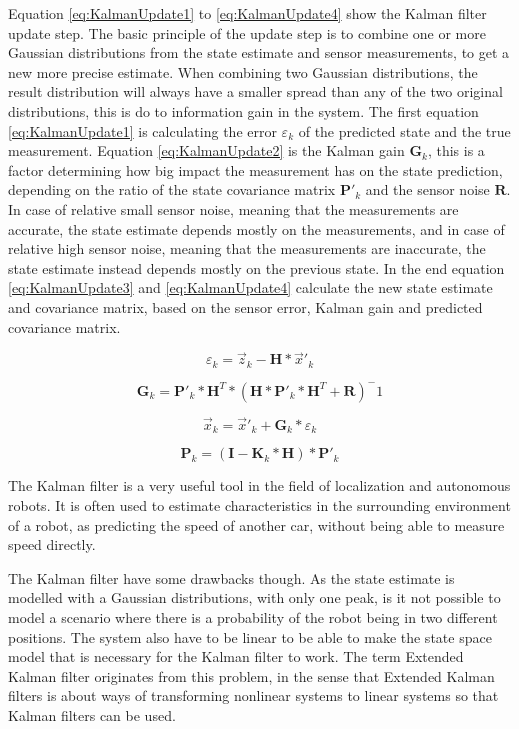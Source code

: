 Equation \ref{eq:KalmanUpdate1} to \ref{eq:KalmanUpdate4} show the Kalman filter update step.
The basic principle of the update step is to combine one or more Gaussian distributions from the state estimate and sensor measurements, to get a new more precise estimate.
When combining two Gaussian distributions, the result distribution will always have a smaller spread than any of the two original distributions, this is do to information gain in the system.
The first equation \ref{eq:KalmanUpdate1} is calculating the error $ \varepsilon_{k} $ of the predicted state and the true measurement.
Equation \ref{eq:KalmanUpdate2} is the Kalman gain $ \boldsymbol{G}_{k} $, this is a factor determining how big impact the measurement has on the state prediction, depending on the ratio of the state covariance matrix $\boldsymbol{P}'_{k}$ and the sensor noise $\boldsymbol{R}$.
In case of relative small sensor noise, meaning that the measurements are accurate, the state estimate depends mostly on the measurements, and in case of relative high sensor noise, meaning that the measurements are inaccurate, the state estimate instead depends mostly on the previous state.
In the end equation \ref{eq:KalmanUpdate3} and \ref{eq:KalmanUpdate4} calculate the new state estimate and covariance matrix, based on the sensor error, Kalman gain and predicted covariance matrix.

\begin{equation}
\label{eq:KalmanUpdate1}
\varepsilon_{k} = \vec{z}_{k} - \boldsymbol{H} * \vec{x}'_{k}
\end{equation}

\begin{equation}
\label{eq:KalmanUpdate2}
\boldsymbol{G}_{k} = \boldsymbol{P}'_{k} * \boldsymbol{H}^T * (\boldsymbol{H} * \boldsymbol{P}'_{k} * \boldsymbol{H}^T + \boldsymbol{R})^-1
\end{equation}

\begin{equation}
\label{eq:KalmanUpdate3}
\vec{x}_{k} = \vec{x}'_{k} + \boldsymbol{G}_{k} * \varepsilon_{k}
\end{equation}

\begin{equation}
\label{eq:KalmanUpdate4}
\boldsymbol{P}_{k} = (\boldsymbol{I} - \boldsymbol{K}_{k} * \boldsymbol{H}) * \boldsymbol{P}'_{k}
\end{equation}

The Kalman filter is a very useful tool in the field of localization and autonomous robots.
It is often used to estimate characteristics in the surrounding environment of a robot, as predicting the speed of another car, without being able to measure speed directly.

The Kalman filter have some drawbacks though.
As the state estimate is modelled with a Gaussian distributions, with only one peak, is it not possible to model a scenario where there is a probability of the robot being in two different positions.
The system also have to be linear to be able to make the state space model that is necessary for the Kalman filter to work.
The term Extended Kalman filter originates from this problem, in the sense that Extended Kalman filters is about ways of transforming nonlinear systems to linear systems so that Kalman filters can be used.